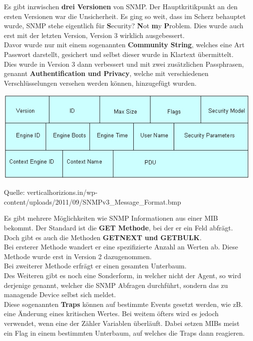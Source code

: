 \documentclass[12pt,a4paper]{report}
\begin{document}
\begin{onehalfspace}
Es gibt inzwischen \textbf{drei Versionen} von SNMP. Der Hauptkritikpunkt an den ersten Versionen war die Unsicherheit. Es ging so weit, dass im Scherz behauptet wurde, SNMP stehe eigentlich für \textbf{S}ecurity? \textbf{N}ot \textbf{m}y \textbf{P}roblem. Dies wurde auch erst mit der letzten Version, Version 3 wirklich ausgebessert.\\
Davor wurde nur mit einem sogenannten \textbf{Community String}, welches eine Art Passwort darstellt, gesichert und selbst dieser wurde in Klartext übermittelt.\\
Dies wurde in Version 3 dann verbessert und mit zwei zusätzlichen Passphrasen, genannt \textbf{Authentification und Privacy}, welche mit verschiedenen Verschlüsselungen versehen werden können, hinzugefügt wurden.\\

\begin{center}
\includegraphics[scale=0.7]{../docs/tarkes/pics/snmpheader.jpg}
\begin{scriptsize}
Quelle: verticalhorizions.in/wp-content/uploads/2011/09/SNMPv3\_Message\_Format.bmp
\end{scriptsize}
\end{center}

Es gibt mehrere Möglichkeiten wie SNMP Informationen aus einer MIB bekommt. Der Standard ist die \textbf{GET Methode}, bei der er ein Feld abfrägt. Doch gibt es auch die Methoden \textbf{GETNEXT und GETBULK}.\\
Bei ersterer Methode wandert er eine spezifizierte Anzahl an Werten ab. Diese Methode wurde erst in Version 2 dazugenommen.\\
Bei zweiterer Methode erfrägt er einen gesamten Unterbaum.\\

Des Weiteren gibt es noch eine Sonderform, in welcher nicht der Agent, so wird derjenige genannt, welcher die SNMP Abfragen durchführt, sondern das zu managende Device selbst sich meldet.\\
Diese sogenannten \textbf{Traps} können auf bestimmte Events gesetzt werden, wie zB. eine Änderung eines kritischen Wertes. Bei weitem öfters wird es jedoch verwendet, wenn eine der Zähler Variablen überläuft. Dabei setzen MIBs meist ein Flag in einem bestimmten Unterbaum, auf welches die Traps dann reagieren.\\


\end{onehalfspace}
\end{document}
